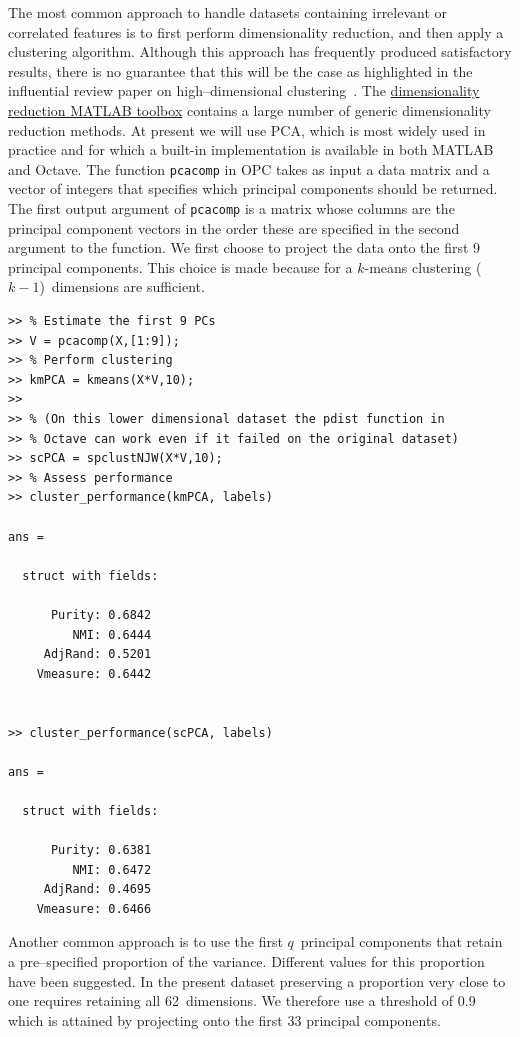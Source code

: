\documentclass{book}
\begin{document}
The most common approach to handle datasets containing irrelevant or correlated
features is to first perform dimensionality reduction, and then apply a
clustering algorithm. Although this approach has frequently produced
satisfactory results, there is no guarantee that this will be the case as highlighted
in the influential review paper on high--dimensional clustering~\cite{KriegelKZ2009}.
%
The \href{https://lvdmaaten.github.io/drtoolbox/}{dimensionality reduction MATLAB
toolbox}
%
contains a large number of generic dimensionality reduction methods. At present we
will use PCA, which is most widely used in practice
and for which a built-in implementation is available in both MATLAB and Octave.
%
The function {\tt pcacomp} in OPC takes as input a data matrix and a vector
of integers that specifies which principal components should be returned.
The first output argument of
{\tt pcacomp} is a matrix whose columns are the principal
component vectors in the order these are specified in the second argument
to the function.
%
We first choose to project the data onto the first 9 principal
components. This choice is made because for a $k$-means clustering 
($k-1$)~dimensions are sufficient.


\begin{lstlisting}
>> % Estimate the first 9 PCs
>> V = pcacomp(X,[1:9]);
>> % Perform clustering
>> kmPCA = kmeans(X*V,10);
>>
>> % (On this lower dimensional dataset the pdist function in
>> % Octave can work even if it failed on the original dataset)
>> scPCA = spclustNJW(X*V,10);
>> % Assess performance
>> cluster_performance(kmPCA, labels)

ans = 

  struct with fields:

      Purity: 0.6842
         NMI: 0.6444
     AdjRand: 0.5201
    Vmeasure: 0.6442


>> cluster_performance(scPCA, labels)

ans = 

  struct with fields:

      Purity: 0.6381
         NMI: 0.6472
     AdjRand: 0.4695
    Vmeasure: 0.6466

\end{lstlisting}


\noindent
%
Another common approach is to use the first $q$~principal components that
retain a pre--specified proportion of the variance. Different values for this
proportion have been suggested. In the present dataset preserving a proportion
very close to one requires retaining all 62~dimensions.  We therefore use a
threshold of 0.9 which is attained by projecting onto the first 33 principal
components.
\end{document}

